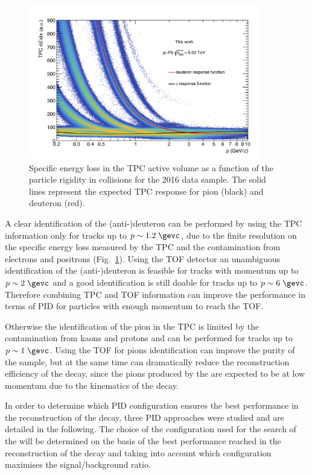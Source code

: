 \begin{figure}
    \centering
    \includegraphics[width=0.9\textwidth]{gfx/pid_tpc}
	\caption{Specific energy loss in the TPC active volume as a function of the particle rigidity in \pPb collisions for the 2016 data sample. The solid lines represent the expected TPC response for pion (black) and deuteron (red).}
	\label{fig:tpc_pid_this}
\end{figure}

A clear identification of the (anti-)deuteron can be performed by using the TPC information only for
tracks up to $p \sim 1.2\; \gevc$, due to the finite resolution on the specific energy loss measured by
the TPC and the contamination from electrons and positrons (Fig.~\ref{fig:tpc_pid_this}).
Using the TOF detector an unambiguous identification of the (anti-)deuteron is feasible for
tracks with momentum up to $p \sim 2\; \gevc$ and a good identification is still doable for tracks up to $p \sim 6\; \gevc$.
Therefore combining TPC and TOF information can improve the performance in terms of PID for particles with enough momentum to 
reach the TOF.

Otherwise the identification of the pion in the TPC is limited by the contamination from kaons and
protons and can be performed for tracks up to $p \sim 1\; \gevc$. Using the TOF for pions
identification can improve the purity of the sample, but at the same time can dramatically reduce
the reconstruction efficiency of the \ds decay, since the pions produced by the \ds are expected to
be at low momentum due to the kinematics of the decay.

In order to determine which PID configuration ensures the best performance in the reconstruction
of the \ds decay, three PID approaches were studied and are detailed in the following. The choice of the configuration used
for the search of the \ds will be determined on the basis of the best performance reached in the reconstruction of the decay
and taking into account which configuration maximises the signal/background ratio.

